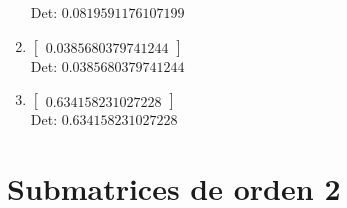 \documentclass[12pt]{article}
\begin{document}
\begin{enumerate}
Det: $0.0819591176107199$\\

\item $\displaystyle \left[\begin{matrix}0.0385680379741244\end{matrix}\right]$\\

Det: $0.0385680379741244$\\

\item $\displaystyle \left[\begin{matrix}0.634158231027228\end{matrix}\right]$\\

Det: $0.634158231027228$\\

\end{enumerate}


\section*{Submatrices de orden 2}
\end{document}

